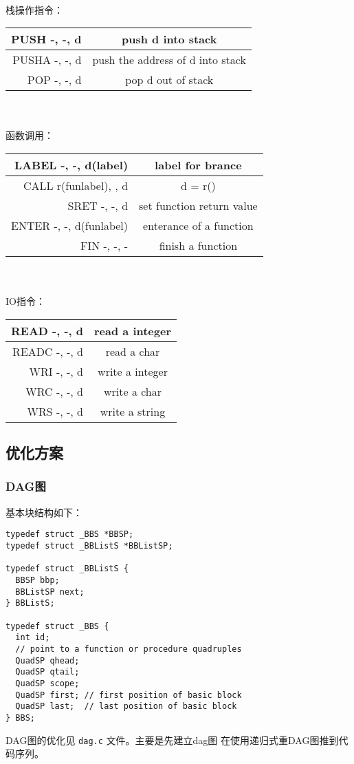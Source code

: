 \vbox{}\\
栈操作指令：\\
\begin{tabular}{r|c}
  \hline
  PUSH  -, -, d & push d into stack\\ \hline
  PUSHA -, -, d & push the address of d into stack \\ \hline
  POP   -, -, d & pop d out of stack\\ \hline
\end{tabular}\\
\vbox{}\\
函数调用：\\
\begin{tabular}{r|c}
  \hline
  LABEL -, -, d(label) & label for brance \\ \hline
  CALL  r(funlabel), , d & d = r()\\ \hline
  SRET  -, -, d & set function return value\\ \hline
  ENTER -, -, d(funlabel) & enterance of a function \\ \hline
  FIN   -, -, -& finish a function\\ \hline
\end{tabular}\\
\vbox{}\\
IO指令：\\
\begin{tabular}{r|c}
  \hline
  READ  -, -, d & read a integer\\ \hline
  READC -, -, d & read a char\\ \hline
  WRI   -, -, d & write a integer \\ \hline
  WRC   -, -, d & write a char \\ \hline
  WRS   -, -, d & write a string\\ \hline
\end{tabular}
\subsection{优化方案}
\subsubsection{DAG图}
基本块结构如下：
\begin{verbatim}
typedef struct _BBS *BBSP;
typedef struct _BBListS *BBListSP;

typedef struct _BBListS {
  BBSP bbp;
  BBListSP next;
} BBListS;

typedef struct _BBS {
  int id;
  // point to a function or procedure quadruples
  QuadSP qhead;
  QuadSP qtail;
  QuadSP scope; 
  QuadSP first; // first position of basic block
  QuadSP last;  // last position of basic block
} BBS;
\end{verbatim}
DAG图的优化见 \verb|dag.c| 文件。主要是先建立dag图
在使用递归式重DAG图推到代码序列。
